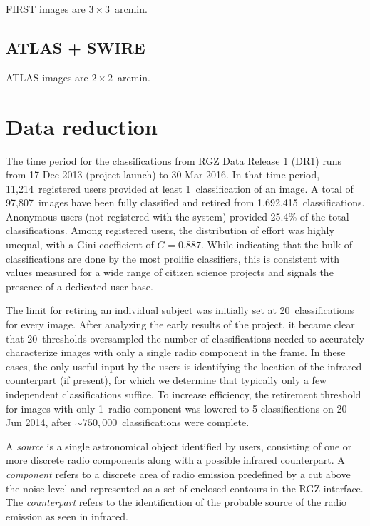 \documentclass[a4,useAMS,usenatbib]{mn2e}
\begin{document}
FIRST images are $3\times3$~arcmin. 

\subsection{ATLAS + SWIRE}\label{ssec:sample_atlas}

ATLAS images are $2\times2$~arcmin. 

\section{Data reduction}\label{sec:data_reduction}

The time period for the classifications from RGZ Data Release 1 (DR1) runs from 17 Dec 2013 (project launch) to 30 Mar 2016. In that time period, 11,214~registered users provided at least 1~classification of an image. A total of 97,807~images have been fully classified and retired from 1,692,415~classifications. Anonymous users (not registered with the system) provided 25.4\% of the total classifications. Among registered users, the distribution of effort was highly unequal, with a Gini coefficient of $G=0.887$. While indicating that the bulk of classifications are done by the most prolific classifiers, this is consistent with values measured for a wide range of citizen science projects \citep{cox15} and signals the presence of a dedicated user base. 

The limit for retiring an individual subject was initially set at 20~classifications for every image. After analyzing the early results of the project, it became clear that 20~thresholds oversampled the number of classifications needed to accurately characterize images with only a single radio component in the frame. In these cases, the only useful input by the users is identifying the location of the infrared counterpart (if present), for which we determine that typically only a few independent classifications suffice. To increase efficiency, the retirement threshold for images with only 1~radio component was lowered to 5 classifications on 20 Jun 2014, after $\sim750,000$~classifications were complete. 

A \emph{source} is a single astronomical object identified by users, consisting of one or more discrete radio components along with a possible infrared counterpart. A \emph{component} refers to a discrete area of radio emission predefined by a cut above the noise level and represented as a set of enclosed contours in the RGZ interface. The \emph{counterpart} refers to the identification of the probable source of the radio emission as seen in infrared. 
\end{document}
